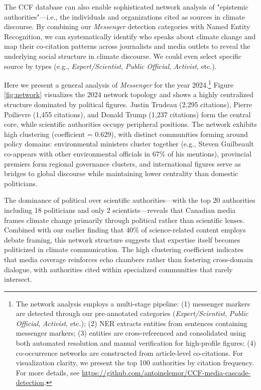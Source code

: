 \documentclass[12pt]{article}
\begin{document}
The CCF database can also enable sophisticated network analysis of "epistemic authorities"—i.e., the individuals and organizations cited as sources in climate discourse. By combining our \emph{Messenger} detection categories with Named Entity Recognition, we can systematically identify who speaks about climate change and map their co-citation patterns across journalists and media outlets to reveal the underlying social structure in climate discourse. We could even select specific source by types (e.g., \emph{Expert/Scientist}, \emph{Public Official}, \emph{Activist}, etc.). 


Here we present a general analysis of \emph{Messenger} for the year 2024.\footnote{The network analysis employs a multi-stage pipeline: (1) messenger markers are detected through our pre-annotated categories (\emph{Expert/Scientist}, \emph{Public Official}, \emph{Activist}, etc.); (2) NER extracts entities from sentences containing messenger markers; (3) entities are cross-referenced and consolidated using both automated resolution and manual verification for high-profile figures; (4) co-occurrence networks are constructed from article-level co-citations. For visualization clarity, we present the top 100 authorities by citation frequency. For more details, see \url{https://github.com/antoinelemor/CCF-media-cascade-detection}.} Figure \ref{fig:network} visualizes the 2024 network topology and shows a highly centralized structure dominated by political figures. Justin Trudeau (2,295 citations), Pierre Poilievre (1,455 citations), and Donald Trump (1,237 citations) form the central core, while scientific authorities occupy peripheral positions. The network exhibits high clustering (coefficient = 0.629), with distinct communities forming around policy domains: environmental ministers cluster together (e.g., Steven Guilbeault co-appears with other environmental officials in 67\% of his mentions), provincial premiers form regional governance clusters, and international figures serve as bridges to global discourse while maintaining lower centrality than domestic politicians.

The dominance of political over scientific authorities—with the top 20 authorities including 18 politicians and only 2 scientists—reveals that Canadian media frames climate change primarily through political rather than scientific lenses. Combined with our earlier finding that 40\% of science-related content employs debate framing, this network structure suggests that expertise itself becomes politicized in climate communication. The high clustering coefficient indicates that media coverage reinforces echo chambers rather than fostering cross-domain dialogue, with authorities cited within specialized communities that rarely intersect. 
\end{document}
